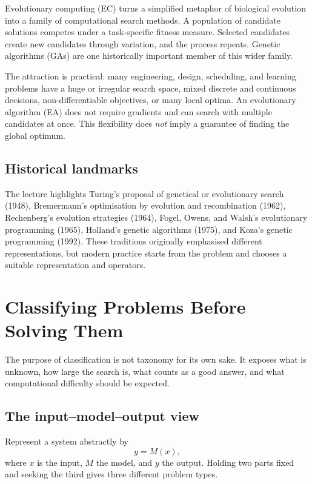 \documentclass[11pt,a4paper]{article}
\begin{document}
Evolutionary computing (EC) turns a simplified metaphor of biological
evolution into a family of computational search methods.  A population of
candidate solutions competes under a task-specific fitness measure.  Selected
candidates create new candidates through variation, and the process repeats.
Genetic algorithms (GAs) are one historically important member of this wider
family.

The attraction is practical: many engineering, design, scheduling, and
learning problems have a huge or irregular search space, mixed discrete and
continuous decisions, non-differentiable objectives, or many local optima.
An evolutionary algorithm (EA) does not require gradients and can search with
multiple candidates at once.  This flexibility does \emph{not} imply a
guarantee of finding the global optimum.

\subsection{Historical landmarks}

The lecture highlights Turing's proposal of genetical or evolutionary search
(1948), Bremermann's optimisation by evolution and recombination (1962),
Rechenberg's evolution strategies (1964), Fogel, Owens, and Walsh's
evolutionary programming (1965), Holland's genetic algorithms (1975), and
Koza's genetic programming (1992).  These traditions originally emphasised
different representations, but modern practice starts from the problem and
chooses a suitable representation and operators.

\section{Classifying Problems Before Solving Them}

The purpose of classification is not taxonomy for its own sake.  It exposes
what is unknown, how large the search is, what counts as a good answer, and
what computational difficulty should be expected.

\subsection{The input--model--output view}

Represent a system abstractly by
\[
  y=M(x),
\]
where $x$ is the input, $M$ the model, and $y$ the output.  Holding two parts
fixed and seeking the third gives three different problem types.
\end{document}
